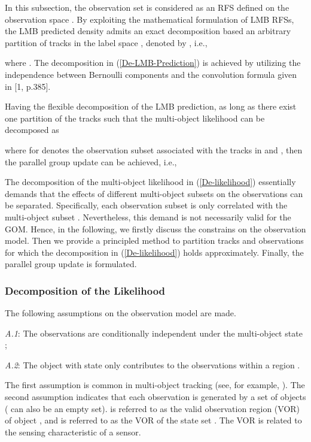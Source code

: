 \documentclass[journal]{IEEEtran}
\begin{document}
{In this subsection, the observation set is considered as an RFS  defined on the observation space .  
By  exploiting the  mathematical formulation of LMB RFSs, the LMB predicted density  admits an exact decomposition based  an arbitrary partition of tracks in the  label space , denoted by , i.e.,

where  . The decomposition in (\ref{De-LMB-Prediction}) is achieved by utilizing the independence between  Bernoulli components and the convolution formula given in [1, p.385].


Having the flexible decomposition of the LMB prediction, as long as there exist one  partition of the tracks such that the multi-object likelihood can be decomposed as

where  for  denotes the observation subset associated with the tracks in  and , then the parallel group update can be achieved, i.e., 


The decomposition of the multi-object likelihood  in (\ref{De-likelihood}) essentially demands that the effects of different multi-object subsets  on the observations can be separated. Specifically, each observation subset  is only correlated with the multi-object subset .
Nevertheless, this demand is not necessarily valid  for the GOM. Hence, in the following, we firstly discuss the constrains on the observation model. Then we provide a principled method to partition  tracks and observations for which the decomposition in (\ref{De-likelihood}) holds approximately. Finally, the parallel group update is formulated. 
\subsubsection{Decomposition of the Likelihood
} 
The following assumptions on the observation model are made.


\textit{A.1}: The observations  are  conditionally independent under   the multi-object state ;

\textit{A.2}: The object with state   only contributes to the observations within a region .


The first assumption is common in multi-object tracking (see, for example, \cite{refr:MeMber_filter,refr:tbd-5,refr:superpositional-2}).  
The second assumption indicates that each observation  is generated by a set of objects  (  can also be an empty  set).   is referred to as the valid observation region (VOR) of  object , and  is referred to as the VOR of the state set .  The VOR is related to the sensing characteristic of a sensor.

}
\end{document}
